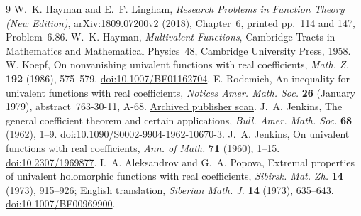 \documentclass[11pt]{article}
\begin{document}
\begin{thebibliography}{9}
 W.~K. Hayman and E.~F. Lingham,
\emph{Research Problems in Function Theory (New Edition)},
\href{https://arxiv.org/abs/1809.07200v2}{arXiv:1809.07200v2} (2018),
Chapter~6, printed pp.~114 and 147, Problem~6.86.
 W.~K. Hayman, \emph{Multivalent Functions},
Cambridge Tracts in Mathematics and Mathematical Physics~48,
Cambridge University Press, 1958.
 W. Koepf, On nonvanishing univalent functions with real
coefficients, \emph{Math. Z.} \textbf{192} (1986), 575--579.
\href{https://doi.org/10.1007/BF01162704}{doi:10.1007/BF01162704}.
 E. Rodemich, An inequality for univalent functions with
real coefficients, \emph{Notices Amer. Math. Soc.} \textbf{26} (January 1979),
abstract~763-30-11, A-68.
\href{https://web.archive.org/web/20220620050040id_/https://www.ams.org/journals/notices/197901/197901FullIssue.pdf}{Archived publisher scan}.
 J.~A. Jenkins, The general coefficient theorem and
certain applications, \emph{Bull. Amer. Math. Soc.} \textbf{68} (1962), 1--9.
\href{https://doi.org/10.1090/S0002-9904-1962-10670-3}{doi:10.1090/S0002-9904-1962-10670-3}.
 J.~A. Jenkins, On univalent functions with real
coefficients, \emph{Ann. of Math.} \textbf{71} (1960), 1--15.
\href{https://doi.org/10.2307/1969877}{doi:10.2307/1969877}.
 I.~A. Aleksandrov and G.~A. Popova, Extremal properties
of univalent holomorphic functions with real coefficients,
\emph{Sibirsk. Mat. Zh.} \textbf{14} (1973), 915--926;
English translation, \emph{Siberian Math. J.} \textbf{14} (1973), 635--643.
\href{https://doi.org/10.1007/BF00969900}{doi:10.1007/BF00969900}.
\end{thebibliography}
\end{document}
